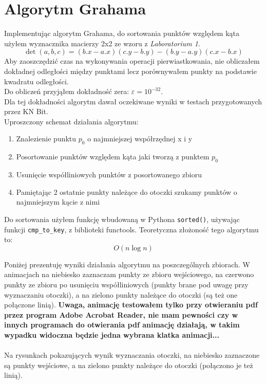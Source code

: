 \documentclass[a4paper]{article}
\begin{document}
\pagebreak
\section{Algorytm Grahama}
Implementując algorytm Grahama, do sortowania punktów względem kąta użyłem wyznacznika macierzy 2x2
ze wzoru z \textit{Laboratorium 1}.
\[
    \det{(a, b, c)} = (b.x - a.x)(c.y - b.y) - (b.y - a.y)(c.x - b.x)   
\]
Aby zaoszczędzić czas na wykonywania operacji pierwiastkowania, nie obliczałem dokładnej odległości między
punktami lecz porównywałem punkty na podstawie kwadratu odległości.
\\
Do obliczeń przyjąłem dokładność zera: $\varepsilon = 10^{-32}$.\\ 
Dla tej dokładności algorytm dawał oczekiwane wyniki w
 testach przygotowanych przez KN Bit.
\\
Uproszczony schemat działania algorytmu:

\begin{enumerate}
    \item Znalezienie punktu $p_0$ o najmniejszej współrzędnej x i y
    \item Posortowanie punktów względem kąta jaki tworzą z punktem $p_0$
    \item Usunięcie współliniowych punktów z posortowanego zbioru
    \item Pamiętając 2 ostatnie punkty należące do otoczki szukamy punktów o najmniejszym kącie z nimi
\end{enumerate}

Do sortowania użyłem funkcję wbudowaną w Pythona \verb|sorted()|, używając funkcji \verb|cmp_to_key|, z biblioteki functools. Teoretyczna złożoność tego algorytmu to:
\[O(n\log n)\]

Poniżej prezentuję wyniki działania algorytmu na poszczególnych zbiorach. W animacjach na niebiesko zaznaczam
punkty ze zbioru wejściowego, na czerwono punkty ze zbioru po usunięciu współliniowych (punkty brane pod uwagę przy wyznaczaniu otoczki),
a na zielono punkty należące do otoczki (są też one połączone linią). \textbf{Uwaga, animację testowałem tylko
przy otwieraniu pdf przez program Adobe Acrobat Reader, nie mam pewności czy w innych programach do otwierania
pdf animację działają, w takim wypadku widoczna będzie jedna wybrana klatka animacji...}
\\\\ 
Na rysunkach pokazujących wynik wyznaczania otoczki, na niebiesko zaznaczone są punkty wejściowe, a na zielono
punkty należące do otoczki (połączono je też linią).
\end{document}
